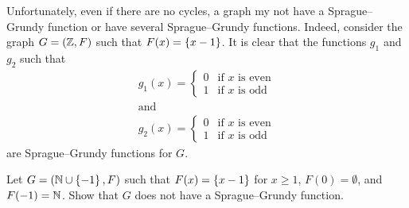 Unfortunately, even if there are no cycles, a graph my not have a
Sprague--Grundy function or have several
Sprague--Grundy functions. Indeed, consider the graph $G = (\mathbb{Z}, F)$ such
that $F(x) = \set{x - 1}$. It is clear that the functions $g_1$ and $g_2$
such that
\begin{gather*}
    g_1(x) =
    \begin{cases}
        0 & \text{if } x \text{ is even} \\
        1 & \text{if } x \text{ is odd}
    \end{cases} \\
    \text{and} \\
    g_2(x) =
    \begin{cases}
        0 & \text{if } x \text{ is even} \\
        1 & \text{if } x \text{ is odd}
    \end{cases}
\end{gather*}
are Sprague--Grundy functions for $G$.

\begin{exercise}
    Let $G = (\N \cup \set{-1}, F)$ such that $F(x) = \set{x - 1}$ for $x \ge 1$,
    $F(0) = \emptyset$, and $F(-1) = \mathbb{N}$.
    Show that $G$ does not have a Sprague--Grundy function.
\end{exercise}

